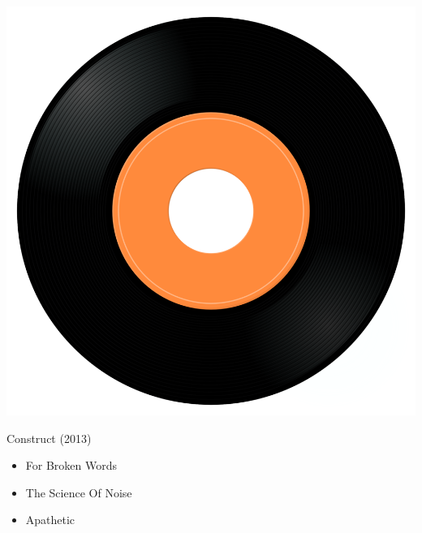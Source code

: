 \begin{minipage}[t]{0.25\textwidth}\vspace{0pt}
\captionsetup{type=figure}
\includegraphics[width=\textwidth]{Images/cover.png}
\caption*{Construct (2013)}
\end{minipage}
\begin{minipage}[t]{0.25\textwidth}\vspace{0pt}
\begin{itemize}[nosep,leftmargin=1em,labelwidth=*,align=left]
	\setlength{\itemsep}{0pt}
	\item For Broken Words
	\item The Science Of Noise
	\item Apathetic
\end{itemize}
\end{minipage}
